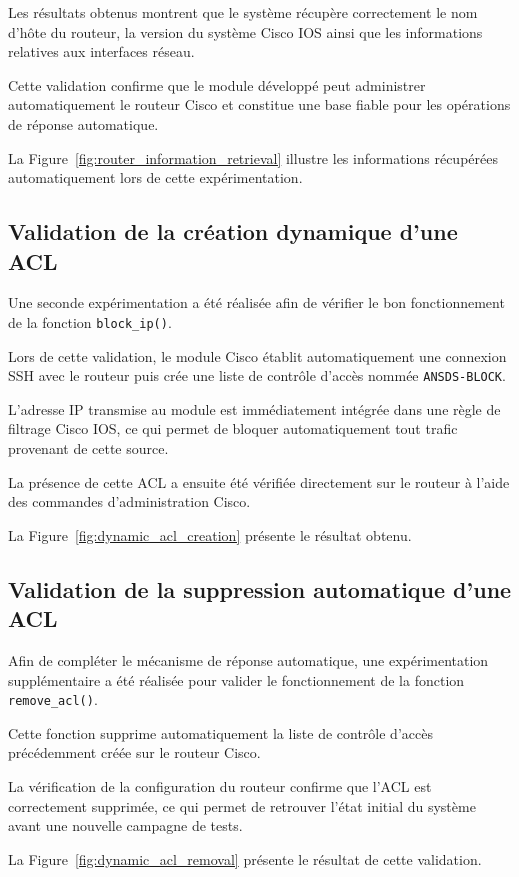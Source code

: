 Les résultats obtenus montrent que le système récupère correctement le nom d'hôte du routeur, la version du système Cisco IOS ainsi que les informations relatives aux interfaces réseau.

Cette validation confirme que le module développé peut administrer automatiquement le routeur Cisco et constitue une base fiable pour les opérations de réponse automatique.

La Figure~\ref{fig:router_information_retrieval} illustre les informations récupérées automatiquement lors de cette expérimentation.

\subsection{Validation de la création dynamique d'une ACL}

Une seconde expérimentation a été réalisée afin de vérifier le bon fonctionnement de la fonction \texttt{block\_ip()}.

Lors de cette validation, le module Cisco établit automatiquement une connexion SSH avec le routeur puis crée une liste de contrôle d'accès nommée \texttt{ANSDS-BLOCK}.

L'adresse IP transmise au module est immédiatement intégrée dans une règle de filtrage Cisco IOS, ce qui permet de bloquer automatiquement tout trafic provenant de cette source.

La présence de cette ACL a ensuite été vérifiée directement sur le routeur à l'aide des commandes d'administration Cisco.

La Figure~\ref{fig:dynamic_acl_creation} présente le résultat obtenu.

\subsection{Validation de la suppression automatique d'une ACL}

Afin de compléter le mécanisme de réponse automatique, une expérimentation supplémentaire a été réalisée pour valider le fonctionnement de la fonction \texttt{remove\_acl()}.

Cette fonction supprime automatiquement la liste de contrôle d'accès précédemment créée sur le routeur Cisco.

La vérification de la configuration du routeur confirme que l'ACL est correctement supprimée, ce qui permet de retrouver l'état initial du système avant une nouvelle campagne de tests.

La Figure~\ref{fig:dynamic_acl_removal} présente le résultat de cette validation.

